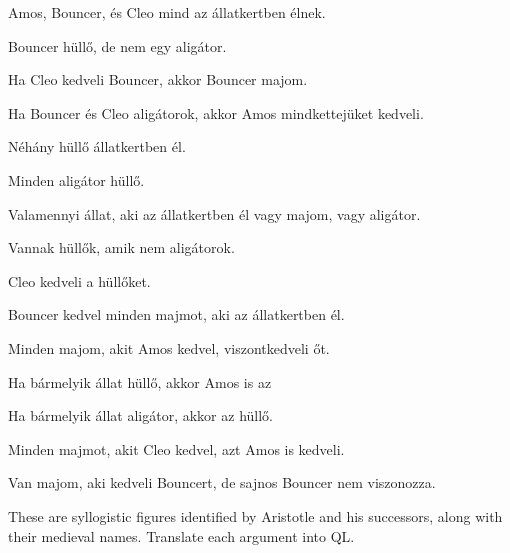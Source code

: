 \begin{earg}
\item Amos, Bouncer, és Cleo mind az állatkertben élnek. 
\item Bouncer hüllő, de nem egy aligátor. 
\item Ha Cleo kedveli Bouncer, akkor Bouncer majom. 
\item Ha Bouncer és Cleo aligátorok, akkor Amos mindkettejüket kedveli.
\item Néhány hüllő állatkertben él. 
\item Minden aligátor hüllő. 
\item Valamennyi állat, aki az állatkertben él vagy majom, vagy aligátor. 
\item Vannak hüllők, amik nem aligátorok.
\item Cleo kedveli a hüllőket.
\item Bouncer kedvel minden majmot, aki az állatkertben él.
\item Minden majom, akit Amos kedvel, viszontkedveli őt.
\item Ha bármelyik állat hüllő, akkor Amos is az
\item Ha bármelyik állat aligátor, akkor az hüllő.
\item Minden majmot, akit Cleo kedvel, azt Amos is kedveli.
\item Van majom, aki kedveli Bouncert, de sajnos Bouncer nem viszonozza.
\end{earg}



\problempart
\label{pr.BarbaraEtc}
These are syllogistic figures identified by Aristotle and his successors, along with their medieval names. Translate each argument into QL.

